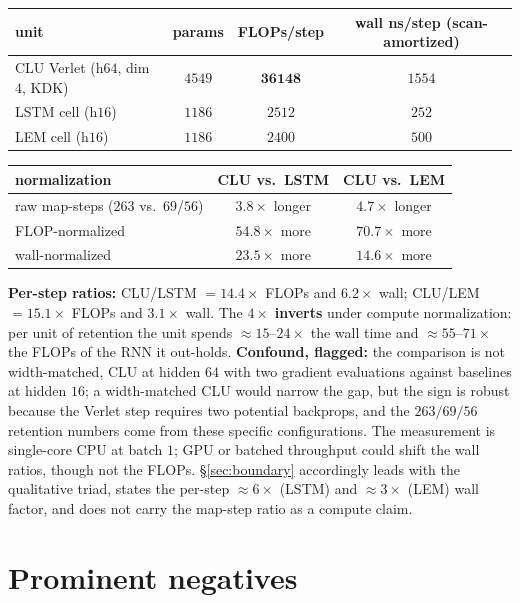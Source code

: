 \documentclass{article}
\begin{document}
\begin{center}\footnotesize
\begin{tabular}{lccc}
\toprule
unit & params & FLOPs/step & wall ns/step (scan-amortized) \\
\midrule
CLU Verlet (h$64$, dim $4$, KDK) & $4549$ & $\mathbf{36148}$ & $1554$ \\
LSTM cell (h$16$) & $1186$ & $2512$ & $252$ \\
LEM cell (h$16$) & $1186$ & $2400$ & $500$ \\
\bottomrule
\end{tabular}
\end{center}

\begin{center}\footnotesize
\begin{tabular}{lcc}
\toprule
normalization & CLU vs.\ LSTM & CLU vs.\ LEM \\
\midrule
raw map-steps ($263$ vs.\ $69$/$56$) & $3.8\times$ longer & $4.7\times$ longer \\
FLOP-normalized & $\mathbf{54.8\times}$ more & $\mathbf{70.7\times}$ more \\
wall-normalized & $\mathbf{23.5\times}$ more & $\mathbf{14.6\times}$ more \\
\bottomrule
\end{tabular}
\end{center}

\textbf{Per-step ratios:} CLU/LSTM $=14.4\times$ FLOPs and $6.2\times$ wall; CLU/LEM $=15.1\times$ FLOPs and $3.1\times$ wall. The $4\times$ \textbf{inverts} under compute normalization: per unit of retention the unit spends $\approx15$--$24\times$ the wall time and $\approx55$--$71\times$ the FLOPs of the RNN it out-holds. \textbf{Confound, flagged:} the comparison is not width-matched, CLU at hidden $64$ with two gradient evaluations against baselines at hidden $16$; a width-matched CLU would narrow the gap, but the sign is robust because the Verlet step requires two potential backprops, and the $263/69/56$ retention numbers come from these specific configurations. The measurement is single-core CPU at batch $1$; GPU or batched throughput could shift the wall ratios, though not the FLOPs. \S\ref{sec:boundary} accordingly leads with the qualitative triad, states the per-step $\approx6\times$ (LSTM) and $\approx3\times$ (LEM) wall factor, and does not carry the map-step ratio as a compute claim.

\section{Prominent negatives}\label{app:neg}
\end{document}
